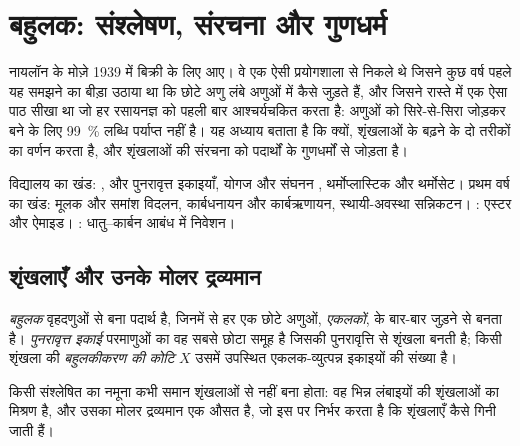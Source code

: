 \chapter{बहुलक: संश्लेषण, संरचना और गुणधर्म}\label{ch:b2:polymer-synthesis}

नायलॉन के मोज़े 1939 में बिक्री के लिए आए। वे एक ऐसी प्रयोगशाला से निकले थे जिसने कुछ वर्ष
पहले यह समझने का बीड़ा उठाया था कि छोटे अणु लंबे अणुओं में कैसे जुड़ते हैं, और जिसने रास्ते में एक ऐसा
पाठ सीखा था जो हर रसायनज्ञ को पहली बार आश्चर्यचकित करता है: अणुओं को सिरे-से-सिरा जोड़कर बने  के लिए
99~\% लब्धि पर्याप्त नहीं है। यह अध्याय बताता है कि क्यों, शृंखलाओं के बढ़ने के दो तरीकों का वर्णन करता है,
और शृंखलाओं की संरचना को पदार्थों के गुणधर्मों से जोड़ता है।

\begin{recall}
विद्यालय का खंड: ,  और पुनरावृत्त इकाइयाँ, योगज और संघनन ,
थर्मोप्लास्टिक और थर्मोसेट। प्रथम वर्ष का खंड: मूलक और समांश विदलन, कार्बधनायन और
कार्बऋणायन, स्थायी-अवस्था सन्निकटन। : एस्टर और ऐमाइड।
: धातु--कार्बन आबंध में निवेशन।
\end{recall}

\section{शृंखलाएँ और उनके मोलर द्रव्यमान}

\begin{definition}[बहुलक]\label{def:b2:polymer-synthesis:polymer}
\emph{बहुलक} वृहदणुओं से बना पदार्थ है, जिनमें से हर एक छोटे अणुओं,
\emph{एकलकों}, के बार-बार जुड़ने से बनता है। \emph{पुनरावृत्त इकाई}
परमाणुओं का वह सबसे छोटा समूह है जिसकी पुनरावृत्ति से शृंखला बनती है; किसी शृंखला की \emph{बहुलकीकरण की
कोटि} $X$ उसमें उपस्थित एकलक-व्युत्पन्न इकाइयों की संख्या है।
\end{definition}

किसी संश्लेषित  का नमूना कभी समान शृंखलाओं से नहीं बना होता: वह
भिन्न लंबाइयों की शृंखलाओं का मिश्रण है, और उसका मोलर द्रव्यमान एक औसत है, जो इस पर निर्भर करता है कि शृंखलाएँ कैसे गिनी जाती हैं।

